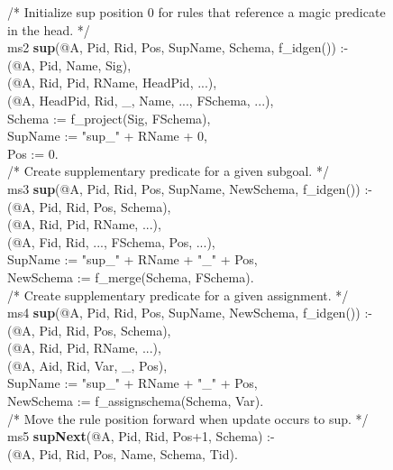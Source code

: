 \begin{figure}[!t]
\ssp
\centering
\begin{boxedminipage}{\linewidth}
/* Initialize sup position 0 for rules that reference a magic predicate in the head. */ \\
ms2 {\bf sup}(@A, Pid, Rid, Pos, SupName, Schema, f\_idgen()) :- \\
(@A, Pid, Name, Sig), \\
(@A, Rid, Pid, RName, HeadPid, ...), \\
(@A, HeadPid, Rid, \_, Name, ..., FSchema, ...), \\
\datalogspace Schema := f\_project(Sig, FSchema), \\
\datalogspace SupName := "sup\_" + RName + 0, \\
\datalogspace Pos := 0. \\

/* Create supplementary predicate for a given subgoal. */ \\
ms3 {\bf sup}(@A, Pid, Rid, Pos, SupName, NewSchema, f\_idgen()) :- \\
(@A, Pid, Rid, Pos, Schema), \\
(@A, Rid, Pid, RName, ...), \\
(@A, Fid, Rid, ..., FSchema, Pos, ...), \\
\datalogspace SupName := "sup\_" + RName + "\_" + Pos, \\
\datalogspace NewSchema := f\_merge(Schema, FSchema). \\
	
/* Create supplementary predicate for a given assignment. */ \\
ms4 {\bf sup}(@A, Pid, Rid, Pos, SupName, NewSchema, f\_idgen()) :- \\
(@A, Pid, Rid, Pos, Schema), \\
(@A, Rid, Pid, RName, ...), \\
(@A, Aid, Rid, Var, \_, Pos), \\
\datalogspace SupName := "sup\_" + RName + "\_" + Pos, \\
\datalogspace NewSchema := f\_assignschema(Schema, Var). \\ 

/* Move the rule position forward when update occurs to sup. */ \\
ms5 {\bf supNext}(@A, Pid, Rid, Pos+1, Schema) :- \\
(@A, Pid, Rid, Pos, Name, Schema, Tid). \\
	

\end{boxedminipage}
\end{figure}
